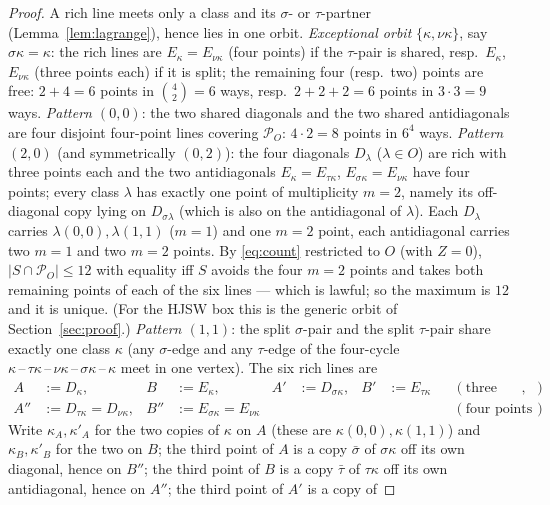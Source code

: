 \documentclass[11pt]{article}
\theoremstyle{remark}
\newcommand{\Pset}{\mathcal{P}}
\begin{document}
\begin{proof}
A rich line meets only a class and its $\sigma$- or $\tau$-partner (Lemma~\ref{lem:lagrange}), hence lies in one orbit.
\emph{Exceptional orbit} $\{\kappa,\nu\kappa\}$, say $\sigma\kappa=\kappa$: the rich lines are $E_\kappa=E_{\nu\kappa}$ (four points)
if the $\tau$-pair is shared, resp.\ $E_\kappa$, $E_{\nu\kappa}$ (three points each) if it is split; the remaining four
(resp.\ two) points are free: $2+4=6$ points in $\binom42=6$ ways, resp.\ $2+2+2=6$ points in $3\cdot3=9$ ways.
\emph{Pattern $(0,0)$}: the two shared diagonals and the two shared antidiagonals are four disjoint four-point lines covering
$\Pset_O$: $4\cdot2=8$ points in $6^4$ ways.
\emph{Pattern $(2,0)$} (and symmetrically $(0,2)$): the four diagonals $D_\lambda$ ($\lambda\in O$) are rich with three points
each and the two antidiagonals $E_\kappa=E_{\tau\kappa}$, $E_{\sigma\kappa}=E_{\nu\kappa}$ have four points; every class $\lambda$ has
exactly one point of multiplicity $m=2$, namely its off-diagonal copy lying on $D_{\sigma\lambda}$ (which is also on the
antidiagonal of $\lambda$).  Each $D_\lambda$ carries $\lambda(0,0),\lambda(1,1)$ ($m=1$) and one $m=2$ point, each antidiagonal
carries two $m=1$ and two $m=2$ points.  By \eqref{eq:count} restricted to $O$ (with $Z=0$), $|S\cap\Pset_O|\le12$ with equality
iff $S$ avoids the four $m=2$ points and takes both remaining points of each of the six lines --- which is lawful; so the
maximum is $12$ and it is unique.  (For the HJSW box this is the generic orbit of Section~\ref{sec:proof}.)
\emph{Pattern $(1,1)$}: the split $\sigma$-pair and the split $\tau$-pair share exactly one class $\kappa$ (any $\sigma$-edge and
any $\tau$-edge of the four-cycle $\kappa\,\text{--}\,\tau\kappa\,\text{--}\,\nu\kappa\,\text{--}\,\sigma\kappa\,\text{--}\,\kappa$
meet in one vertex).  The six rich lines are
\begin{align*}
 A&:=D_\kappa,& B&:=E_\kappa,& A'&:=D_{\sigma\kappa},& B'&:=E_{\tau\kappa}&&(\text{three points each}),\\
 A''&:=D_{\tau\kappa}=D_{\nu\kappa},& B''&:=E_{\sigma\kappa}=E_{\nu\kappa}&&&&&&(\text{four points each}).
\end{align*}
Write $\kappa_A,\kappa'_A$ for the two copies of $\kappa$ on $A$ (these are $\kappa(0,0),\kappa(1,1)$) and $\kappa_B,\kappa'_B$ for
the two on $B$; the third point of $A$ is a copy $\bar\sigma$ of $\sigma\kappa$ off its own diagonal, hence on $B''$; the third
point of $B$ is a copy $\bar\tau$ of $\tau\kappa$ off its own antidiagonal, hence on $A''$; the third point of $A'$ is a copy of

\end{proof}
\end{document}
